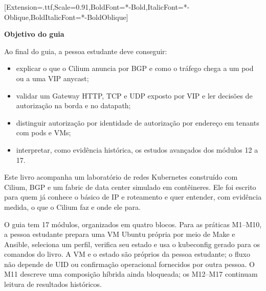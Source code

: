 \documentclass[12pt,openany,oneside,a4paper,chapter=TITLE,english,brazil]{abntex2}
\providecommand{\tightlist}{\setlength{\itemsep}{0pt}\setlength{\parskip}{0pt}}
\begin{document}
\renewcommand{\listfigurename}{Lista de figuras}
\frenchspacing

\imprimircapa
\imprimirfolhaderosto

\setmonofont{DejaVuSansMono}[Extension=.ttf,Scale=0.91,BoldFont=*-Bold,ItalicFont=*-Oblique,BoldItalicFont=*-BoldOblique]

\begin{mdframed}[linewidth=0.6pt,innertopmargin=6pt,innerbottommargin=6pt]
\small
\textbf{Objetivo do guia}

Ao final do guia, a pessoa estudante deve conseguir:

\begin{itemize}
\tightlist
\item
  explicar o que o Cilium anuncia por BGP e como o tráfego chega a um
  pod ou a uma VIP anycast;
\item
  validar um Gateway HTTP, TCP e UDP exposto por VIP e ler decisões de
  autorização na borda e no datapath;
\item
  distinguir autorização por identidade de autorização por endereço em
  tenants com pods e VMs;
\item
  interpretar, como evidência histórica, os estudos avançados dos
  módulos 12 a 17.
\end{itemize}
\end{mdframed}

Este livro acompanha um laboratório de redes Kubernetes construído com Cilium,
BGP e um fabric de data center simulado em contêineres. Ele foi escrito para
quem já conhece o básico de IP e roteamento e quer entender, com evidência
medida, o que o Cilium faz e onde ele para.

O guia tem 17 módulos, organizados em quatro blocos. Para as práticas M1--M10,
a pessoa estudante prepara uma VM Ubuntu própria por meio de Make e Ansible,
seleciona um perfil, verifica seu estado e usa o kubeconfig gerado para os
comandos do livro. A VM e o estado são próprios da pessoa estudante; o fluxo
não depende de UID ou confirmação operacional fornecidos por outra pessoa. O M11
descreve uma composição híbrida ainda bloqueada; os M12--M17
continuam leitura de resultados históricos.
\end{document}
